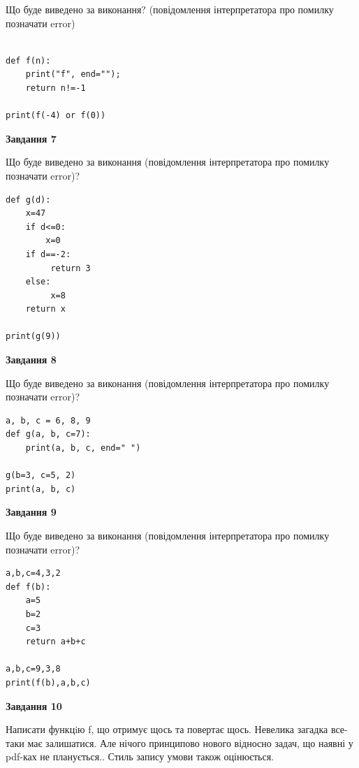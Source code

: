 \documentclass[12pt, ukrainian]{article}
\begin{document}
{\begin {large}
Що буде виведено за виконання? (повідомлення інтерпретатора про помилку позначати error)\par
\begin{verbatim}

def f(n):
    print("f", end="");
    return n!=-1

print(f(-4) or f(0))
\end{verbatim}

{\begin {center}\textbf{Завдання 7}\end {center}}

Що буде виведено за виконання (повідомлення інтерпретатора про помилку позначати error)?\par
\begin{verbatim}
def g(d):
    x=47
    if d<=0: 
        x=0
    if d==-2:
         return 3
    else:
         x=8
    return x

print(g(9))
\end{verbatim}

{\begin {center}\textbf{Завдання 8}\end {center}}

Що буде виведено за виконання (повідомлення інтерпретатора про помилку позначати error)?\par
\begin{verbatim}
a, b, c = 6, 8, 9
def g(a, b, c=7):
    print(a, b, c, end=" ")

g(b=3, c=5, 2)
print(a, b, c)
\end{verbatim}

{\begin {center}\textbf{Завдання 9}\end {center}}

Що буде виведено за виконання (повідомлення інтерпретатора про помилку позначати error)?\par
\begin{verbatim}
a,b,c=4,3,2
def f(b):
    a=5
    b=2
    c=3
    return a+b+c

a,b,c=9,3,8
print(f(b),a,b,c)
\end{verbatim}

{\begin {center}\textbf{Завдання 10}\end {center}}


Написати функцiю f, що отримує щось та повертає щось. Невелика загадка все-таки має залишатися. Але нічого принципово нового відносно задач, що наявні у pdf-ках не планується.. Стиль запису умови також оцінюється.\par
\end {large}}
\newpage
\end{document}
